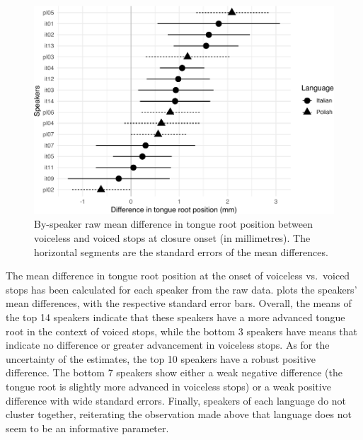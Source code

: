 \documentclass[preprint]{JASAnew}
\begin{document}
\begin{figure}
\includegraphics[width=\linewidth]{./Figure8-1} \caption{By-speaker raw mean difference in tongue root position between voiceless and voiced stops at closure onset (in millimetres). The horizontal segments are the standard errors of the mean differences.}\label{f:Figure8}
\end{figure}

The mean difference in tongue root position at the onset of voiceless
vs.~voiced stops has been calculated for each speaker from the raw data.
 plots the speakers' mean differences, with the
respective standard error bars. Overall, the means of the top 14
speakers indicate that these speakers have a more advanced tongue root
in the context of voiced stops, while the bottom 3 speakers have means
that indicate no difference or greater advancement in voiceless stops.
As for the uncertainty of the estimates, the top 10 speakers have a
robust positive difference. The bottom 7 speakers show either a weak
negative difference (the tongue root is slightly more advanced in
voiceless stops) or a weak positive difference with wide standard
errors. Finally, speakers of each language do not cluster together,
reiterating the observation made above that language does not seem to be
an informative parameter.
\end{document}
